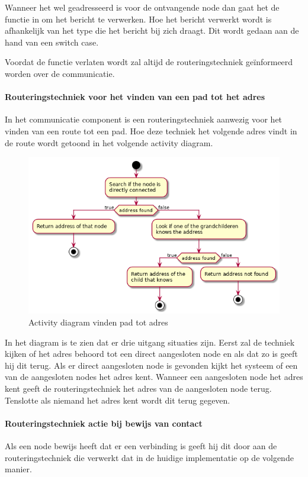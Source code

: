 \documentclass[a4paper, 11pt, oneside]{report}
\begin{document}
Wanneer het wel geadresseerd is voor de ontvangende node dan gaat het de functie in om het bericht te verwerken. Hoe het bericht verwerkt wordt is afhankelijk van het type die het bericht bij zich draagt. Dit wordt gedaan aan de hand van een switch case. 

Voordat de functie verlaten wordt zal altijd de routeringstechniek geïnformeerd worden over de communicatie.

\paragraph{Routeringstechniek voor het vinden van een pad tot het adres}
\label{DetailedDesign:Communicatie:Activity:routeringtechniek:aanvraag}
In het communicatie component is een routeringstechniek aanwezig voor het vinden van een route tot een pad. Hoe deze techniek het volgende adres vindt in de route wordt getoond in het volgende activity diagram. 

\begin{figure}[H]
	\begin{center}\includegraphics[width=.45\linewidth]{UML/out/Communication/activity/padtotadres/padtotadres.png}\end{center}
	\caption{Activity diagram vinden pad tot adres}
	\label{fig:communication:routeringtechniek:aanvraag}
\end{figure}

In het diagram is te zien dat er drie uitgang situaties zijn. 
Eerst zal de techniek kijken of het adres behoord tot een direct aangesloten node en als dat zo is geeft hij dit terug.
Als er direct aangesloten node is gevonden kijkt het systeem of een van de aangesloten nodes het adres kent.
Wanneer een aangesloten node het adres kent geeft de routeringstechniek het adres van de aangesloten node terug.
Tenslotte als niemand het adres kent wordt dit terug gegeven.

\paragraph{Routeringstechniek actie bij bewijs van contact}
\label{DetailedDesign:Communicatie:Activity:routeringtechniek:contactgevonden}
Als een node bewijs heeft dat er een verbinding is geeft hij dit door aan de routeringstechniek die verwerkt dat in de huidige implementatie op de volgende manier.
\end{document}
